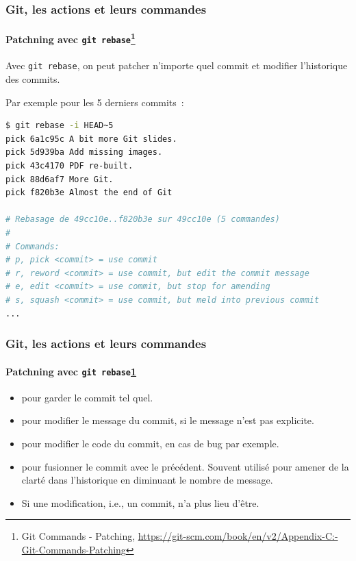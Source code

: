 \documentclass{beamer}
\begin{document}
    \begin{frame}[fragile]
        \frametitle{Git, les actions et leurs commandes}
        \framesubtitle{Patchning avec \lstinline{git rebase}\footnote{\label{progitpatching}Git Commands - Patching, \url{https://git-scm.com/book/en/v2/Appendix-C:-Git-Commands-Patching}}}
        \transdissolve
        Avec \lstinline{git rebase}, on peut patcher n'importe quel commit et modifier l'historique des commits.

        Par exemple pour les 5 derniers commits~:
        \begin{lstlisting}[language=sh]
$ git rebase -i HEAD~5
pick 6a1c95c A bit more Git slides.
pick 5d939ba Add missing images.
pick 43c4170 PDF re-built.
pick 88d6af7 More Git.
pick f820b3e Almost the end of Git

# Rebasage de 49cc10e..f820b3e sur 49cc10e (5 commandes)
#
# Commands:
# p, pick <commit> = use commit
# r, reword <commit> = use commit, but edit the commit message
# e, edit <commit> = use commit, but stop for amending
# s, squash <commit> = use commit, but meld into previous commit
...
        \end{lstlisting}
    \end{frame}

    \begin{frame}
        \frametitle{Git, les actions et leurs commandes}
        \framesubtitle{Patchning avec \lstinline{git rebase}\cref{progitpatching}}
        \transdissolve
        \begin{itemize}
            \item {} pour garder le commit tel quel.
            \item {} pour modifier le message du commit, si le message n'est pas explicite.
            \item {} pour modifier le code du commit, en cas de bug par exemple.
            \item {} pour fusionner le commit avec le précédent.
            Souvent utilisé pour amener de la clarté dans l'historique en diminuant le nombre de message.
            \item {} Si une modification, i.e., un commit, n'a plus lieu d'être.
        \end{itemize}
    \end{frame}
\end{document}
